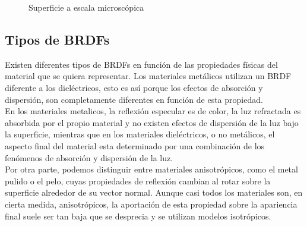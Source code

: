         \begin{figure}[H]
            \vspace{0.5cm}
            \centering
            \caption{Superficie a escala microsc\'opica}
            \vspace{0.5cm}
        \end{figure}

    \egroup


    \subsection{Tipos de BRDFs}
    Existen diferentes tipos de BRDFs en funci\'on de las propiedades f\'isicas del material que se quiera representar. Los
    materiales met\'alicos utilizan un BRDF diferente a los diel\'ectricos, esto es as\'i porque los efectos de absorci\'on y
    dispersi\'on, son completamente diferentes en funci\'on de esta propiedad.\\

    En los materiales metalicos, la reflexi\'on especular es de color, la luz refractada es absorbida por el propio material
    y no existen efectos de dispersi\'on de la luz bajo la superficie, mientras que en los materiales diel\'ectricos, o no
    met\'alicos, el aspecto final del material esta determinado por una combinaci\'on de los fen\'omenos de absorci\'on y
    dispersi\'on de la luz.\\

    Por otra parte, podemos distinguir entre materiales anisotr\'opicos, como el metal pulido o el pelo, cuyas propiedades
    de reflexi\'on cambian al rotar sobre la superficie alrededor de su vector normal. Aunque casi todos los materiales son, en cierta medida, anisotr\'opicos, la
    aportaci\'on de esta propiedad sobre la apariencia final suele ser tan baja que se desprecia y se utilizan modelos
    isotr\'opicos.\\

